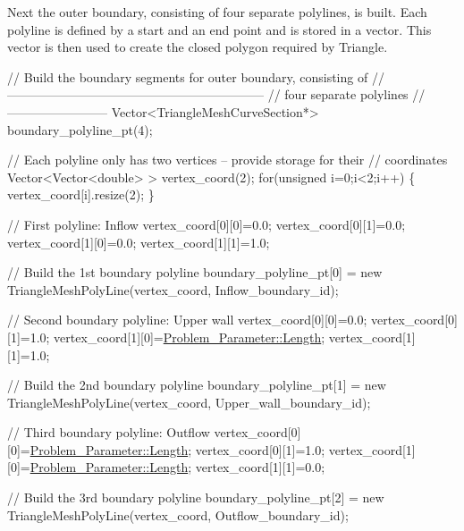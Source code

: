 Next the outer boundary, consisting of four separate polylines, is built. Each polyline is defined by a start and an end point and is stored in a vector. This vector is then used to create the closed polygon required by {\ttfamily Triangle}.


\begin{DoxyCodeInclude}
 \textcolor{comment}{// Build the boundary segments for outer boundary, consisting of}
 \textcolor{comment}{//--------------------------------------------------------------}
 \textcolor{comment}{// four separate polylines}
 \textcolor{comment}{//------------------------}
 Vector<TriangleMeshCurveSection*> boundary\_polyline\_pt(4);
 
 \textcolor{comment}{// Each polyline only has two vertices -- provide storage for their}
 \textcolor{comment}{// coordinates}
 Vector<Vector<double> > vertex\_coord(2);
 \textcolor{keywordflow}{for}(\textcolor{keywordtype}{unsigned} i=0;i<2;i++)
  \{
   vertex\_coord[i].resize(2);
  \}
 
 \textcolor{comment}{// First polyline: Inflow}
 vertex\_coord[0][0]=0.0;
 vertex\_coord[0][1]=0.0;
 vertex\_coord[1][0]=0.0;
 vertex\_coord[1][1]=1.0;
 
 \textcolor{comment}{// Build the 1st boundary polyline}
 boundary\_polyline\_pt[0] = \textcolor{keyword}{new} TriangleMeshPolyLine(vertex\_coord,
                                                   Inflow\_boundary\_id);
 
 \textcolor{comment}{// Second boundary polyline: Upper wall}
 vertex\_coord[0][0]=0.0;
 vertex\_coord[0][1]=1.0;
 vertex\_coord[1][0]=\hyperlink{namespaceProblem__Parameter_a7b67840fea463f29b53d12f7bd7cb34b}{Problem\_Parameter::Length};
 vertex\_coord[1][1]=1.0;

 \textcolor{comment}{// Build the 2nd boundary polyline}
 boundary\_polyline\_pt[1] = \textcolor{keyword}{new} TriangleMeshPolyLine(vertex\_coord,
                                                   Upper\_wall\_boundary\_id);

 \textcolor{comment}{// Third boundary polyline: Outflow}
 vertex\_coord[0][0]=\hyperlink{namespaceProblem__Parameter_a7b67840fea463f29b53d12f7bd7cb34b}{Problem\_Parameter::Length};
 vertex\_coord[0][1]=1.0;
 vertex\_coord[1][0]=\hyperlink{namespaceProblem__Parameter_a7b67840fea463f29b53d12f7bd7cb34b}{Problem\_Parameter::Length};
 vertex\_coord[1][1]=0.0;

 \textcolor{comment}{// Build the 3rd boundary polyline}
 boundary\_polyline\_pt[2] = \textcolor{keyword}{new} TriangleMeshPolyLine(vertex\_coord,
                                                   Outflow\_boundary\_id);


\end{DoxyCodeInclude}
